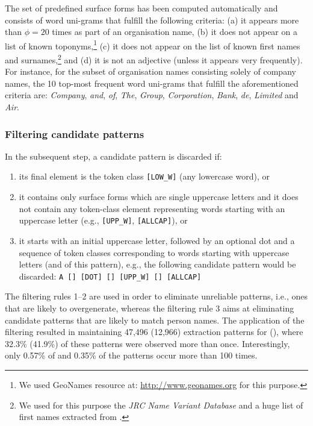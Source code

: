 \documentclass[output=paper]{langsci/langscibook}
\begin{document}
The set of predefined surface forms has been computed automatically and consists of word uni-grams that fulfill the following criteria: (a) it appears more than $\phi=20$ times as part of an organisation name, (b) it does not appear on a list of known toponyms,\footnote{We used GeoNames resource at: \url{http://www.geonames.org} for this purpose.} (c) it does not appear on the list of known first names and surnames,\footnote{We used for this purpose the {\itshape JRC Name Variant Database} and a huge list of first names extracted from \citet{piskorski-11}.} and (d) it is not an adjective (unless it appears very frequently). For instance, for the subset of  organisation names consisting solely of company names, the 10 top-most frequent word uni-grams that fulfill the aforementioned criteria are: \textit{Company}, \textit{and}, \textit{of}, \textit{The}, \textit{Group}, \textit{Corporation}, \textit{Bank}, \textit{de}, \textit{Limited} and \textit{Air}.  

\subsubsection{Filtering candidate patterns} In the subsequent
step, a candidate pattern is discarded if:
\begin{enumerate}
\item its final element is the token class \verb+[LOW_W]+ (any
  lowercase word), or
\item it contains only surface forms which are single uppercase
  letters and it does not contain any token-class element representing
  words starting with an uppercase letter (e.g., \verb+[UPP_W]+,
  \verb+[ALLCAP]+), or
\item it starts with an initial uppercase letter, followed by an
  optional dot and a sequence of token classes corresponding to words
  starting with uppercase letters (and  of this pattern),
  e.g., the following candidate pattern would be discarded:
  \verb+A [] [DOT] [] [UPP_W] [] [ALLCAP]+
\end{enumerate} 

The filtering rules 1--2 are used in order to eliminate
unreliable patterns, i.e., ones that are likely to overgenerate,
whereas the filtering rule 3 aims at eliminating candidate patterns
that are likely to match person names.  The application of the
filtering resulted in maintaining 47,496 (12,966) extraction patterns
for  (), where 32.3\% (41.9\%) of these patterns were
observed more than once. Interestingly, only 0.57\% of  and
0.35\% of the  patterns occur more than 
100 times.
\end{document}
